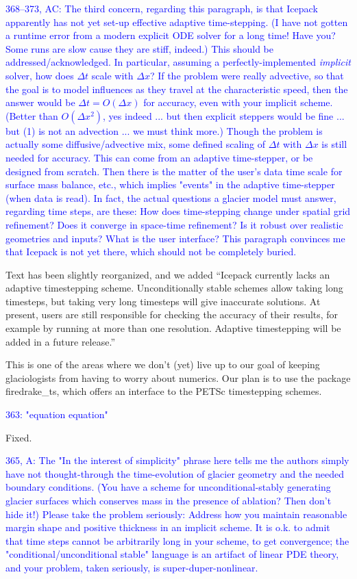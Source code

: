 \documentclass{article}
\theoremstyle{definition}
\theoremstyle{plain}
\begin{document}
\textcolor{blue}{368--373, AC:  The third concern, regarding this paragraph, is that Icepack apparently has not yet set-up effective adaptive time-stepping.  (I have not gotten a runtime error from a modern explicit ODE solver for a long time!  Have you?  Some runs are slow cause they are stiff, indeed.)  This should be addressed/acknowledged.  In particular, assuming a perfectly-implemented \emph{implicit} solver, how does $\Delta t$ scale with $\Delta x$?  If the problem were really advective, so that the goal is to model influences as they travel at the characteristic speed, then the answer would be $\Delta t = O(\Delta x)$ for accuracy, even with your implicit scheme.  (Better than $O(\Delta x^2)$, yes indeed ... but then explicit steppers would be fine ... but (1) is not an advection ... we must think more.)  Though the problem is actually some diffusive/advective mix, some defined scaling of $\Delta t$ with $\Delta x$ is still needed for accuracy.  This can come from an adaptive time-stepper, or be designed from scratch.  Then there is the matter of the user's data time scale for surface mass balance, etc., which implies "events" in the adaptive time-stepper (when data is read).  In fact, the actual questions a glacier model must answer, regarding time steps, are these:  How does time-stepping change under spatial grid refinement?  Does it converge in space-time refinement?  Is it robust over realistic geometries and inputs?  What is the user interface?  This paragraph convinces me that Icepack is not yet there, which should not be completely buried.}

Text has been slightly reorganized, and we added ``Icepack currently lacks an adaptive timestepping scheme.
Unconditionally stable schemes allow taking long timesteps, but taking very long timesteps will give inaccurate solutions.
At present, users are still responsible for checking the accuracy of their results, for example by running at more than one resolution.
Adaptive timestepping will be added in a future release.''

This is one of the areas where we don't (yet) live up to our goal of keeping glaciologists from having to worry about numerics.
Our plan is to use the package firedrake\_ts, which offers an interface to the PETSc timestepping schemes.

\textcolor{blue}{363:  "equation equation"}

Fixed.

\textcolor{blue}{365, A:  The "In the interest of simplicity" phrase here tells me the authors simply have not thought-through the time-evolution of glacier geometry and the needed boundary conditions.  (You have a scheme for unconditional-stably generating glacier surfaces which conserves mass in the presence of ablation?  Then don't hide it!)  Please take the problem seriously:  Address how you maintain reasonable margin shape and positive thickness in an implicit scheme.  It is o.k. to admit that time steps cannot be arbitrarily long in your scheme, to get convergence; the "conditional/unconditional stable" language is an artifact of linear PDE theory, and your problem, taken seriously, is super-duper-nonlinear.}
\end{document}
